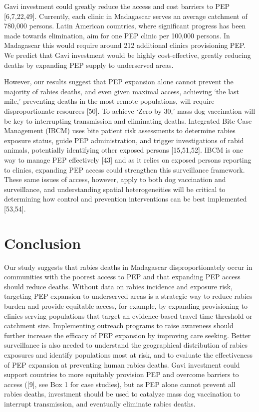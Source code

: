 \documentclass[
  oneside]{book}
\begin{document}
Gavi investment could greatly reduce the access and cost barriers to PEP
{[}6,7,22,49{]}. Currently, each clinic in Madagascar serves an average
catchment of 780,000 persons. Latin American countries, where
significant progress has been made towards elimination, aim for one PEP
clinic per 100,000 persons. In Madagascar this would require around 212
additional clinics provisioning PEP. We predict that Gavi investment
would be highly cost-effective, greatly reducing deaths by expanding PEP
supply to underserved areas.

However, our results suggest that PEP expansion alone cannot prevent the
majority of rabies deaths, and even given maximal access, achieving `the
last mile,' preventing deaths in the most remote populations, will
require disproportionate resources {[}50{]}. To achieve `Zero by 30,' mass
dog vaccination will be key to interrupting transmission and eliminating
deaths. Integrated Bite Case Management (IBCM) uses bite patient risk
assessments to determine rabies exposure status, guide PEP
administration, and trigger investigations of rabid animals, potentially
identifying other exposed persons {[}15,51,52{]}. IBCM is one way to
manage PEP effectively {[}43{]} and as it relies on exposed persons
reporting to clinics, expanding PEP access could strengthen this
surveillance framework. These same issues of access, however, apply to
both dog vaccination and surveillance, and understanding spatial
heterogeneities will be critical to determining how control and
prevention interventions can be best implemented {[}53,54{]}.

\hypertarget{conclusion}{%
\section{Conclusion}\label{conclusion}}

Our study suggests that rabies deaths in Madagascar disproportionately
occur in communities with the poorest access to PEP and that expanding
PEP access should reduce deaths. Without data on rabies incidence and
exposure risk, targeting PEP expansion to underserved areas is a
strategic way to reduce rabies burden and provide equitable access, for
example, by expanding provisioning to clinics serving populations that
target an evidence-based travel time threshold or catchment size.
Implementing outreach programs to raise awareness should further
increase the efficacy of PEP expansion by improving care seeking. Better
surveillance is also needed to understand the geographical distribution
of rabies exposures and identify populations most at risk, and to
evaluate the effectiveness of PEP expansion at preventing human rabies
deaths. Gavi investment could support countries to more equitably
provision PEP and overcome barriers to access ({[}9{]}, see Box 1 for case
studies), but as PEP alone cannot prevent all rabies deaths, investment
should be used to catalyze mass dog vaccination to interrupt
transmission, and eventually eliminate rabies deaths.
\end{document}
